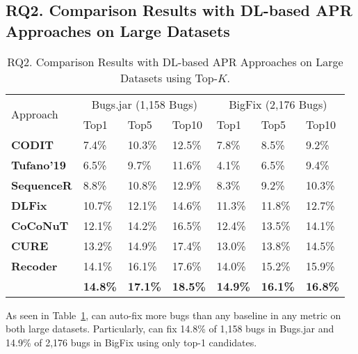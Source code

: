 \subsection{\bf RQ2. Comparison Results with DL-based APR Approaches on Large Datasets}
\label{rq2:sec}

\begin{table}[t]
	\caption{RQ2. Comparison Results with DL-based APR Approaches on Large Datasets using Top-$K$.}
	\vspace{-10pt}
        {\small
	\begin{center}
		\renewcommand{\arraystretch}{1}
		\begin{tabular}{p{1.6cm}|p{0.7cm}|p{0.7cm}|p{0.7cm}|p{0.7cm}|p{0.7cm}|p{0.7cm}}\hline
			\multirow{2}{*}{Approach}&\multicolumn{3}{c|}{Bugs.jar (1,158 Bugs)}&\multicolumn{3}{c}{BigFix (2,176 Bugs)}\\\cline{2-7}
		                          & Top1   & Top5   & Top10  & Top1   & Top5   & Top10\\
			\hline
			\textbf{CODIT}        & 7.4\%  & 10.3\% & 12.5\% & 7.8\%  & 8.5\%  & 9.2\%\\
			\textbf{Tufano'19}  & 6.5\%  & 9.7\%  & 11.6\% & 4.1\%  & 6.5\%  & 9.4\%\\
			\textbf{SequenceR}    & 8.8\%  & 10.8\% & 12.9\% & 8.3\%  & 9.2\%  & 10.3\%\\
			\textbf{DLFix}        & 10.7\% & 12.1\% & 14.6\% & 11.3\% & 11.8\% & 12.7\%\\
			\textbf{CoCoNuT}      & 12.1\% & 14.2\% & 16.5\% & 12.4\% & 13.5\% & 14.1\%\\
			\textbf{CURE}         & 13.2\% & 14.9\% & 17.4\% & 13.0\% & 13.8\% & 14.5\%\\
                        \textbf{Recoder}         & 14.1\% & 16.1\% & 17.6\% & 14.0\% & 15.2\% & 15.9\%\\
			\hline
			\textbf{\tool}        & \textbf{14.8\%} & \textbf{17.1\%} & \textbf{18.5\%} & \textbf{14.9\%} & \textbf{16.1\%} & \textbf{16.8\%}\\
			\hline
		\end{tabular}
		\label{RQ2_results}
	\end{center}
        }
\end{table}


As seen in Table~\ref{RQ2_results}, {\tool} can auto-fix more bugs
than any baseline in any metric on both large datasets.  Particularly,
{\tool} can fix 14.8\% of 1,158 bugs in Bugs.jar and 14.9\% of 2,176
bugs in BigFix using only top-1 candidates.

